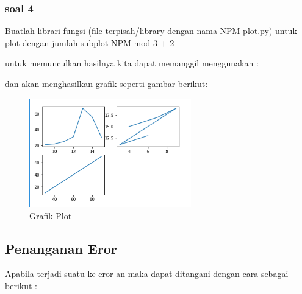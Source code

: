 \subsubsection{soal 4}
Buatlah librari fungsi (ﬁle terpisah/library dengan nama NPM plot.py) untuk plot dengan jumlah subplot NPM mod 3 + 2

untuk memunculkan hasilnya kita dapat memanggil menggunakan :


dan akan menghasilkan grafik seperti gambar berikut:
\begin{figure}[H]
\centering
\includegraphics[width=7cm]{figures/6/1174003/p4.png}
\caption{Grafik Plot}
\label{dwisep}
\end{figure}

\subsection{Penanganan Eror}
Apabila terjadi suatu ke-eror-an maka dapat ditangani dengan cara sebagai berikut :
